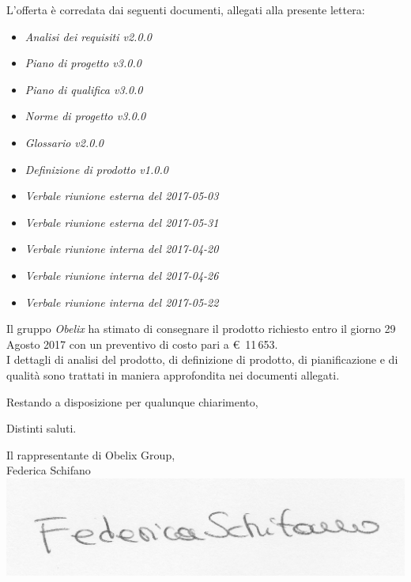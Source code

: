 \documentclass[10 pt,a4paper]{article}
\begin{document}
L'offerta è corredata dai seguenti documenti, allegati alla presente
lettera:
\vspace{.1in}
\begin{itemize}
\item \emph{Analisi dei requisiti v2.0.0}
\item \emph{Piano di progetto v3.0.0}
\item \emph{Piano di qualifica v3.0.0}
\item \emph{Norme di progetto v3.0.0}
\item \emph{Glossario v2.0.0}
\item \emph{Definizione di prodotto v1.0.0}
\item \emph{Verbale riunione esterna del 2017-05-03}
\item \emph{Verbale riunione esterna del 2017-05-31}
\item \emph{Verbale riunione interna del 2017-04-20}
\item \emph{Verbale riunione interna del 2017-04-26}
\item \emph{Verbale riunione interna del 2017-05-22}
\end{itemize}


\clearpage

Il gruppo \emph{Obelix} ha stimato di consegnare il prodotto richiesto
entro il giorno 29 Agosto 2017 con un preventivo di costo pari
a \euro  \, 11\,653. \\

I dettagli di analisi del prodotto, di definizione di prodotto, di pianificazione e di qualità sono trattati in maniera approfondita nei
documenti allegati.


\vspace{.5in}
Restando a disposizione per qualunque chiarimento,\\

\vspace{.1in}

Distinti saluti.

\vspace{.15in}


\begin{flushright}
Il rappresentante di Obelix Group,\\
Federica Schifano\\
\includegraphics[width=.5\textwidth]{../../file_comuni/firme/fs.jpg}
\end{flushright}
\end{document}

